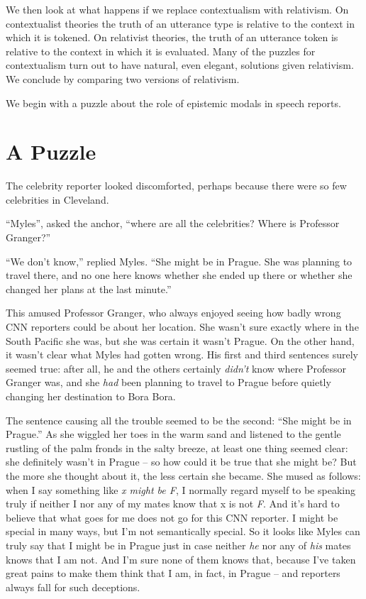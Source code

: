 We then look at what happens if we replace contextualism with relativism. On contextualist theories the truth of an utterance type is relative to the context in which it is tokened. On relativist theories, the truth of an utterance token is relative to the context in which it is evaluated. Many of the puzzles for contextualism turn out to have natural, even elegant, solutions given relativism. We conclude by comparing two versions of relativism.
 
We begin with a puzzle about the role of epistemic modals in speech reports.
 
\section{A Puzzle} 
 
The celebrity reporter looked discomforted, perhaps because there were so few celebrities in Cleveland.
 
``Myles'', asked the anchor, ``where are all the celebrities? Where is Professor Granger?''
 
``We don't know,'' replied Myles. ``She might be in Prague. She was planning to travel there, and no one here knows whether she ended up there or whether she changed her plans at the last minute.''
 
This amused Professor Granger, who always enjoyed seeing how badly wrong CNN reporters could be about her location. She wasn't sure exactly where in the South Pacific she was, but she was certain it wasn't Prague. On the other hand, it wasn't clear what Myles had gotten wrong. His first and third sentences surely seemed true: after all, he and the others certainly \textit{didn't} know where Professor Granger was, and she \textit{had} been planning to travel to Prague before quietly changing her destination to Bora Bora.
 
The sentence causing all the trouble seemed to be the second: ``She might be in Prague.'' As she wiggled her toes in the warm sand and listened to the gentle rustling of the palm fronds in the salty breeze, at least one thing seemed clear: she definitely wasn't in Prague -- so how could it be true that she might be? But the more she thought about it, the less certain she became. She mused as follows: when I say something like \textit{x might be F}, I normally regard myself to be speaking truly if neither I nor any of my mates know that x is not \textit{F}. And it's hard to believe that what goes for me does not go for this CNN reporter. I might be special in many ways, but I'm not semantically special. So it looks like Myles can truly say that I might be in Prague just in case neither \textit{he} nor any of \textit{his} mates knows that I am not. And I'm sure none of them knows that, because I've taken great pains to make them think that I am, in fact, in Prague -- and reporters always fall for such deceptions. 
 
